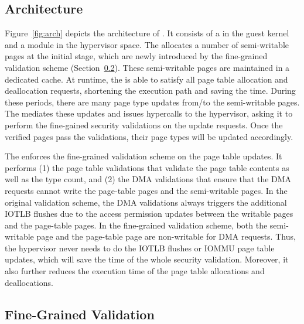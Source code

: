 \subsection{\name Architecture}
Figure~\ref{fig:arch} depicts the architecture of \name. It consists of a \cache in the guest kernel and a \name module in the hypervisor space.
The \cache allocates a number of semi-writable pages at the initial stage,  which are newly introduced by the fine-grained validation scheme (Section~\ref{sec:fine-grained}).
These semi-writable pages are maintained in a dedicated cache.
At runtime, the \cache is able to satisfy all page table allocation and deallocation requests, shortening the execution path and saving the time.
During these periods, there are many page type updates from/to the semi-writable pages.
The \cache mediates these updates and issues hypercalls to the hypervisor, asking it to perform the fine-gained security validations on the update requests.
Once the verified pages pass the validations, their page types will be updated accordingly.

The \module enforces the fine-grained validation scheme on the page table updates.
It performs (1) the page table validations that validate the page table contents as well as the type count, and (2) the DMA validations that ensure that the DMA requests cannot write the page-table pages and the semi-writable pages.
In the original validation scheme, the DMA validations always triggers the additional IOTLB flushes due to the access permission updates between the writable pages and the page-table pages.
In the fine-grained validation scheme, both the semi-writable page and the page-table page are non-writable for DMA requests.
Thus, the hypervisor never needs to do the IOTLB flushes or IOMMU page table updates, which will save the time of the whole security validation.
Moreover, it also further reduces the execution time of the page table allocations and deallocations.

\subsection{Fine-Grained Validation}\label{sec:fine-grained}

